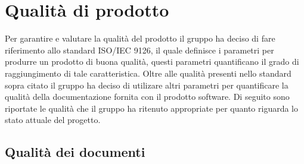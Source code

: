 \section{Qualità di prodotto}
	Per garantire e valutare la qualità del prodotto il gruppo ha deciso di fare riferimento allo standard ISO/IEC 9126, il quale definisce i parametri per produrre un prodotto di buona qualità, questi parametri quantificano il grado di raggiungimento di tale caratteristica. Oltre alle qualità presenti nello standard sopra citato il gruppo ha deciso di utilizare altri parametri per quantificare la qualità della documentazione fornita con il prodotto software. Di seguito sono riportate le qualità che il gruppo ha ritenuto appropriate per quanto riguarda lo stato attuale del progetto.
%		
%		
%		
%		
%		
	\subsection{Qualità dei documenti}
		

